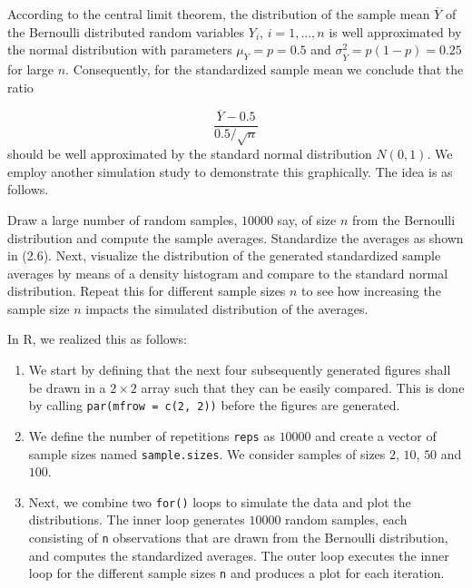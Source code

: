 \documentclass[]{book}
\theoremstyle{definition}
\theoremstyle{definition}
\theoremstyle{definition}
\theoremstyle{remark}
\begin{document}
According to the central limit theorem, the distribution of the sample
mean \(\overline{Y}\) of the Bernoulli distributed random variables
\(Y_i\), \(i=1,...,n\) is well approximated by the normal distribution
with parameters \(\mu_Y=p=0.5\) and
\(\sigma^2_{\overline{Y}} = p(1-p) = 0.25\) for large \(n\).
Consequently, for the standardized sample mean we conclude that the
ratio

\[ \frac{\overline{Y} - 0.5}{0.5/\sqrt{n}} \tag{2.6}\] should be well
approximated by the standard normal distribution \(N(0,1)\). We employ
another simulation study to demonstrate this graphically. The idea is as
follows.

Draw a large number of random samples, \(10000\) say, of size \(n\) from
the Bernoulli distribution and compute the sample averages. Standardize
the averages as shown in (2.6). Next, visualize the distribution of the
generated standardized sample averages by means of a density histogram
and compare to the standard normal distribution. Repeat this for
different sample sizes \(n\) to see how increasing the sample size \(n\)
impacts the simulated distribution of the averages.

In R, we realized this as follows:

\begin{enumerate}
\def\labelenumi{\arabic{enumi}.}
\item
  We start by defining that the next four subsequently generated figures
  shall be drawn in a \(2\times2\) array such that they can be easily
  compared. This is done by calling \texttt{par(mfrow = c(2, 2))} before
  the figures are generated.
\item
  We define the number of repetitions \texttt{reps} as \(10000\) and
  create a vector of sample sizes named \texttt{sample.sizes}. We
  consider samples of sizes \(2\), \(10\), \(50\) and \(100\).
\item
  Next, we combine two \texttt{for()} loops to simulate the data and
  plot the distributions. The inner loop generates \(10000\) random
  samples, each consisting of \texttt{n} observations that are drawn
  from the Bernoulli distribution, and computes the standardized
  averages. The outer loop executes the inner loop for the different
  sample sizes \texttt{n} and produces a plot for each iteration.
\end{enumerate}
\end{document}
